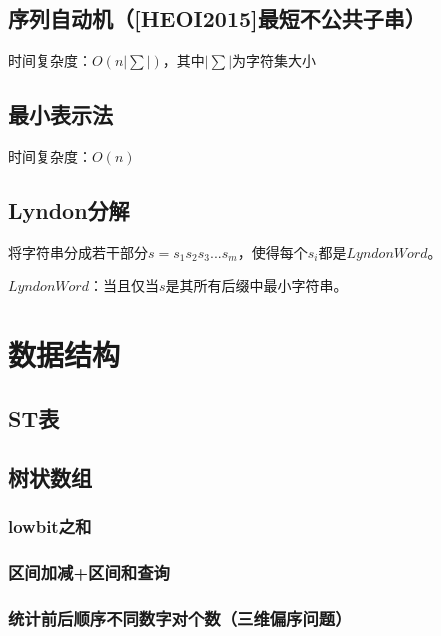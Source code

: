 \documentclass[twoside,a4paper]{article}
\begin{document}
\subsection{序列自动机（[HEOI2015]最短不公共子串）}
时间复杂度：$O(n|\sum|)$，其中$|\sum|$为字符集大小


\subsection{最小表示法}
时间复杂度：$O(n)$


\subsection{Lyndon分解}
将字符串分成若干部分$s = s_{1}s_{2}s_{3}...s_{m}$，使得每个$s_{i}$都是$Lyndon Word$。\par
$Lyndon Word$：当且仅当$s$是其所有后缀中最小字符串。



\section{数据结构}

\subsection{ST表}



\subsection{树状数组}

\subsubsection{lowbit之和}


\subsubsection{区间加减+区间和查询}


\subsubsection{统计前后顺序不同数字对个数（三维偏序问题）}

\end{document}
